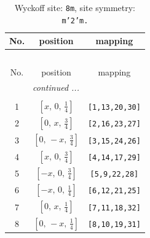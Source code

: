\documentclass[fleqn,8pt]{jsarticle}
\begin{document}
\begin{longtable}{ccc}
\caption{Wyckoff site: {\tt 8m}, site symmetry: {\tt m'2'm.}}
 \\
 \hline \hline
No. & position & mapping \\ \hline \endfirsthead

\multicolumn{2}{l}{\tablename\ \thetable{}} \\
 \hline \hline
No. & position & mapping \\ \hline \endhead

 \hline \hline
\multicolumn{2}{r}{\footnotesize\it continued ...} \\ \endfoot

 \hline \hline
\multicolumn{2}{r}{} \\ \endlastfoot

1 & $\left[ x,\, 0,\, \frac{1}{4} \right]$ & {\tt [1,13,20,30]} \\ \hline
2 & $\left[ 0,\, x,\, \frac{3}{4} \right]$ & {\tt [2,16,23,27]} \\ \hline
3 & $\left[ 0,\, - x,\, \frac{3}{4} \right]$ & {\tt [3,15,24,26]} \\ \hline
4 & $\left[ x,\, 0,\, \frac{3}{4} \right]$ & {\tt [4,14,17,29]} \\ \hline
5 & $\left[ - x,\, 0,\, \frac{3}{4} \right]$ & {\tt [5,9,22,28]} \\ \hline
6 & $\left[ - x,\, 0,\, \frac{1}{4} \right]$ & {\tt [6,12,21,25]} \\ \hline
7 & $\left[ 0,\, x,\, \frac{1}{4} \right]$ & {\tt [7,11,18,32]} \\ \hline
8 & $\left[ 0,\, - x,\, \frac{1}{4} \right]$ & {\tt [8,10,19,31]} \\
\end{longtable}
\renewcommand{\arraystretch}{1.2}
\end{document}

